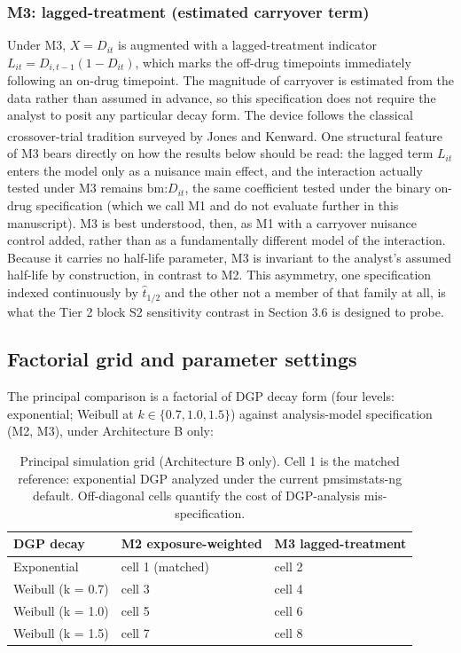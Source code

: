 \documentclass[
  11pt,
]{article}
\begin{document}
\subsubsection{M3: lagged-treatment (estimated carryover term)}\label{m3-lagged-treatment-estimated-carryover-term}

Under M3, \(X = D_{it}\) is augmented with a lagged-treatment indicator
\(L_{it} = D_{i,t-1}(1 - D_{it})\), which marks the off-drug timepoints
immediately following an on-drug timepoint. The magnitude of
carryover is estimated from the data rather than assumed in advance,
so this specification does not require the analyst to posit any
particular decay form. The device follows the classical
crossover-trial tradition surveyed by Jones and Kenward\textsuperscript{}. One structural feature of M3 bears directly
on how the results below should be read: the lagged term \(L_{it}\)
enters the model only as a nuisance main effect, and the interaction
actually tested under M3 remains \(\text{bm:}D_{it}\), the same
coefficient tested under the binary on-drug specification (which we
call M1 and do not evaluate further in this manuscript). M3 is best
understood, then, as M1 with a carryover nuisance control added,
rather than as a fundamentally different model of the interaction.
Because it carries no half-life parameter, M3 is invariant to the
analyst's assumed half-life by construction, in contrast to M2. This
asymmetry, one specification indexed continuously by
\(\hat{t}_{1/2}\) and the other not a member of that family at all, is
what the Tier 2 block S2 sensitivity contrast in Section 3.6 is
designed to probe.

\subsection{Factorial grid and parameter settings}\label{factorial-grid-and-parameter-settings}

The principal comparison is a factorial of DGP decay form (four
levels: exponential; Weibull at \(k \in \{0.7, 1.0, 1.5\}\)) against
analysis-model specification (M2, M3), under Architecture B only:

\begin{table}

\caption{\label{tab:grid-table}Principal simulation grid (Architecture B only). Cell 1
    is the matched reference: exponential DGP analyzed under the
    current pmsimstats-ng default. Off-diagonal cells quantify the
    cost of DGP-analysis mis-specification.}
\centering
\begin{tabular}[t]{l|l|l}
\hline
DGP decay & M2 exposure-weighted & M3 lagged-treatment\\
\hline
Exponential & cell 1 (matched) & cell 2\\
\hline
Weibull (k = 0.7) & cell 3 & cell 4\\
\hline
Weibull (k = 1.0) & cell 5 & cell 6\\
\hline
Weibull (k = 1.5) & cell 7 & cell 8\\
\hline
\end{tabular}
\end{table}
\end{document}
